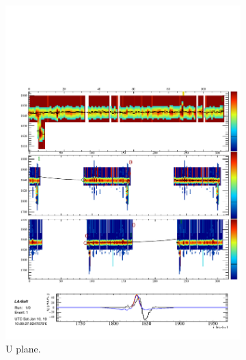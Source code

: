 \begin{figure}
  \centering
  \begin{subfigure}[t]{0.3\linewidth}
    \centering
    \includegraphics[width=\textwidth]{HitFindingU.pdf}
    \caption{U plane.}
    \label{fig:HitFindingU}
  \end{subfigure}
  \hfill
  \begin{subfigure}[t]{0.3\linewidth}
    \centering

\end{subfigure}
\end{figure}
